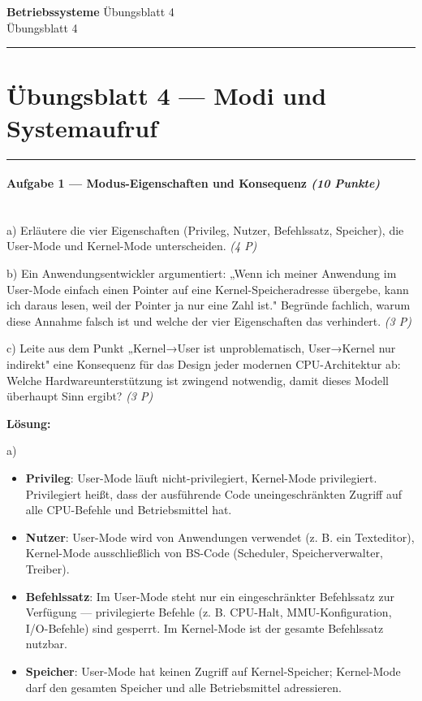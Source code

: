 \documentclass[11pt, a4paper]{article}
\providecommand{\nichttitle}{Übungsblatt}
\providecommand{\nichtsubtitle}{}
\renewcommand{\nichttitle}{Betriebssysteme}
\renewcommand{\nichtsubtitle}{Übungsblatt 4}
\begin{document}
\begin{center}
{\Large\bfseries\color{accent}\nichttitle}
\ifx\nichtsubtitle\empty\else
  \\[2pt]{\normalsize\color{accent!80!black}\nichtsubtitle}
\fi
\\[2pt]
\color{accent}\rule{0.4\linewidth}{0.8pt}\color{black}
\end{center}
\vspace{4pt}


\section{Übungsblatt 4 — Modi und Systemaufruf}


\noindent\textcolor{rulegray}{\rule{\linewidth}{0.4pt}}


\paragraph{Aufgabe 1 — Modus-Eigenschaften und Konsequenz \textit{(10 Punkte)}}\mbox{}\\[2pt]

a) Erläutere die vier Eigenschaften (Privileg, Nutzer, Befehlssatz, Speicher), die User-Mode und Kernel-Mode unterscheiden. \textit{(4 P)}


b) Ein Anwendungsentwickler argumentiert: „Wenn ich meiner Anwendung im User-Mode einfach einen Pointer auf eine Kernel-Speicheradresse übergebe, kann ich daraus lesen, weil der Pointer ja nur eine Zahl ist." Begründe fachlich, warum diese Annahme falsch ist und welche der vier Eigenschaften das verhindert. \textit{(3 P)}


c) Leite aus dem Punkt „Kernel→User ist unproblematisch, User→Kernel nur indirekt" eine Konsequenz für das Design jeder modernen CPU-Architektur ab: Welche Hardwareunterstützung ist zwingend notwendig, damit dieses Modell überhaupt Sinn ergibt? \textit{(3 P)}


\textbf{Lösung:}


a)

\begin{itemize}
  \item \textbf{Privileg}: User-Mode läuft nicht-privilegiert, Kernel-Mode privilegiert. Privilegiert heißt, dass der ausführende Code uneingeschränkten Zugriff auf alle CPU-Befehle und Betriebsmittel hat.
  \item \textbf{Nutzer}: User-Mode wird von Anwendungen verwendet (z. B. ein Texteditor), Kernel-Mode ausschließlich von BS-Code (Scheduler, Speicherverwalter, Treiber).
  \item \textbf{Befehlssatz}: Im User-Mode steht nur ein eingeschränkter Befehlssatz zur Verfügung — privilegierte Befehle (z. B. CPU-Halt, MMU-Konfiguration, I/O-Befehle) sind gesperrt. Im Kernel-Mode ist der gesamte Befehlssatz nutzbar.
  \item \textbf{Speicher}: User-Mode hat keinen Zugriff auf Kernel-Speicher; Kernel-Mode darf den gesamten Speicher und alle Betriebsmittel adressieren.
\end{itemize}
\end{document}

